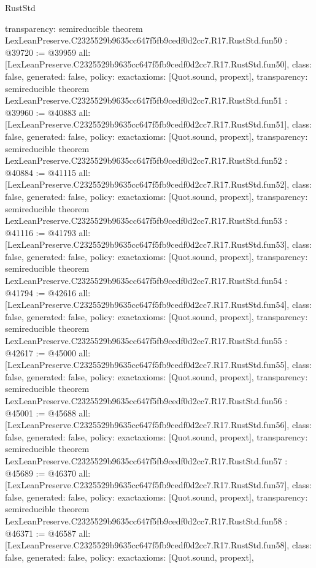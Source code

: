 \begin{lexlean}{RustStd}
\begin{coremodule}
{  transparency: semireducible
}
theorem LexLeanPreserve.C2325529b9635cc647f5fb9cedf0d2cc7.R17.RustStd.fun50 : @39720 := @39959 {
  all: [LexLeanPreserve.C2325529b9635cc647f5fb9cedf0d2cc7.R17.RustStd.fun50],
  class: false,
  generated: false,
  policy: exact{axioms: [Quot.sound, propext]},
  transparency: semireducible
}
theorem LexLeanPreserve.C2325529b9635cc647f5fb9cedf0d2cc7.R17.RustStd.fun51 : @39960 := @40883 {
  all: [LexLeanPreserve.C2325529b9635cc647f5fb9cedf0d2cc7.R17.RustStd.fun51],
  class: false,
  generated: false,
  policy: exact{axioms: [Quot.sound, propext]},
  transparency: semireducible
}
theorem LexLeanPreserve.C2325529b9635cc647f5fb9cedf0d2cc7.R17.RustStd.fun52 : @40884 := @41115 {
  all: [LexLeanPreserve.C2325529b9635cc647f5fb9cedf0d2cc7.R17.RustStd.fun52],
  class: false,
  generated: false,
  policy: exact{axioms: [Quot.sound, propext]},
  transparency: semireducible
}
theorem LexLeanPreserve.C2325529b9635cc647f5fb9cedf0d2cc7.R17.RustStd.fun53 : @41116 := @41793 {
  all: [LexLeanPreserve.C2325529b9635cc647f5fb9cedf0d2cc7.R17.RustStd.fun53],
  class: false,
  generated: false,
  policy: exact{axioms: [Quot.sound, propext]},
  transparency: semireducible
}
theorem LexLeanPreserve.C2325529b9635cc647f5fb9cedf0d2cc7.R17.RustStd.fun54 : @41794 := @42616 {
  all: [LexLeanPreserve.C2325529b9635cc647f5fb9cedf0d2cc7.R17.RustStd.fun54],
  class: false,
  generated: false,
  policy: exact{axioms: [Quot.sound, propext]},
  transparency: semireducible
}
theorem LexLeanPreserve.C2325529b9635cc647f5fb9cedf0d2cc7.R17.RustStd.fun55 : @42617 := @45000 {
  all: [LexLeanPreserve.C2325529b9635cc647f5fb9cedf0d2cc7.R17.RustStd.fun55],
  class: false,
  generated: false,
  policy: exact{axioms: [Quot.sound, propext]},
  transparency: semireducible
}
theorem LexLeanPreserve.C2325529b9635cc647f5fb9cedf0d2cc7.R17.RustStd.fun56 : @45001 := @45688 {
  all: [LexLeanPreserve.C2325529b9635cc647f5fb9cedf0d2cc7.R17.RustStd.fun56],
  class: false,
  generated: false,
  policy: exact{axioms: [Quot.sound, propext]},
  transparency: semireducible
}
theorem LexLeanPreserve.C2325529b9635cc647f5fb9cedf0d2cc7.R17.RustStd.fun57 : @45689 := @46370 {
  all: [LexLeanPreserve.C2325529b9635cc647f5fb9cedf0d2cc7.R17.RustStd.fun57],
  class: false,
  generated: false,
  policy: exact{axioms: [Quot.sound, propext]},
  transparency: semireducible
}
theorem LexLeanPreserve.C2325529b9635cc647f5fb9cedf0d2cc7.R17.RustStd.fun58 : @46371 := @46587 {
  all: [LexLeanPreserve.C2325529b9635cc647f5fb9cedf0d2cc7.R17.RustStd.fun58],
  class: false,
  generated: false,
  policy: exact{axioms: [Quot.sound, propext]},
}
\end{coremodule}
\end{lexlean}
